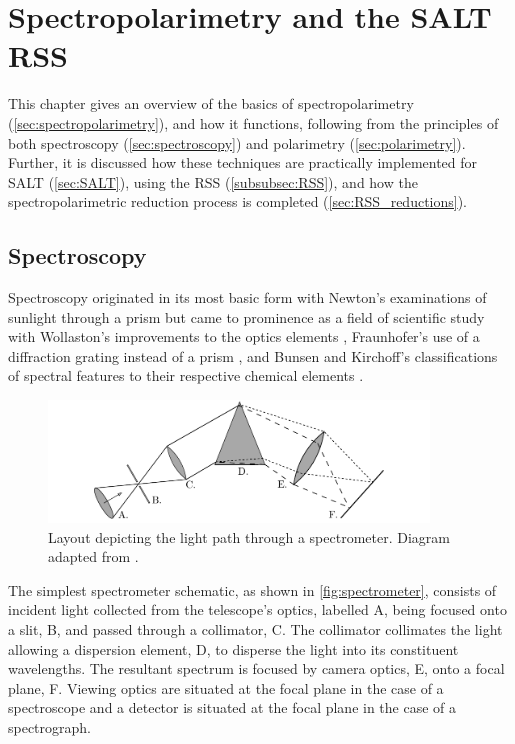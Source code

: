 \chapter{Spectropolarimetry and the SALT RSS}

This chapter gives an overview of the basics of spectropolarimetry (\autoref{sec:spectropolarimetry}), and how it functions, following from the principles of both spectroscopy (\autoref{sec:spectroscopy}) and polarimetry (\autoref{sec:polarimetry}). Further, it is discussed how these techniques are practically implemented for \gls{SALT} (\autoref{sec:SALT}), using the \gls{RSS} (\autoref{subsubsec:RSS}), and how the spectropolarimetric reduction process is completed (\autoref{sec:RSS_reductions}).

\section{Spectroscopy}\label{sec:spectroscopy}

Spectroscopy originated in its most basic form with Newton's examinations of sunlight through a prism \citep{opticks} but came to prominence as a field of scientific study with Wollaston's improvements to the optics elements \citep{WollPrism}, Fraunhofer's use of a diffraction grating instead of a prism \citep{FraunGrating}, and Bunsen and Kirchoff's classifications of spectral features to their respective chemical elements \citep{KirBunSpec}.

\begin{figure}[t]
    \centering
    \includegraphics[width = 0.9\textwidth]{figures/2_spectrometer.pdf}
    \caption{Layout depicting the light path through a spectrometer. Diagram adapted from \cite{BirneyObsAstro}.}
    \label{fig:spectrometer}
\end{figure}

The simplest spectrometer schematic, as shown in \autoref{fig:spectrometer}, consists of incident light collected from the telescope's optics, labelled A, being focused onto a slit, B, and passed through a collimator, C. The collimator collimates the light allowing a dispersion element, D, to disperse the light into its constituent wavelengths. The resultant spectrum is focused by camera optics, E, onto a focal plane, F. Viewing optics are situated at the focal plane in the case of a spectroscope and a detector is situated at the focal plane in the case of a spectrograph.

